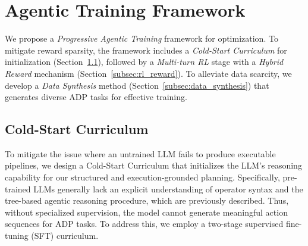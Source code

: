 \section{Agentic Training Framework}
\label{sec:agentic_training_framework}



We propose a \emph{Progressive Agentic Training} framework for optimization. To mitigate reward sparsity, the framework includes a \emph{Cold-Start Curriculum} for initialization (Section~\ref{subsec:cold_start}), followed by a \emph{Multi-turn RL} stage with a \emph{Hybrid Reward} mechanism (Section~\ref{subsec:rl_reward}). To alleviate data scarcity, we develop a \emph{Data Synthesis} method (Section~\ref{subsec:data_synthesis}) that generates diverse ADP tasks for effective training.

\subsection{Cold-Start Curriculum}
\label{subsec:cold_start}

% 

To mitigate the issue where an untrained LLM fails to produce executable pipelines, we design a Cold-Start Curriculum that initializes the LLM's reasoning capability for our structured and execution-grounded planning. 
Specifically, pre-trained LLMs generally lack an explicit understanding of operator syntax and the tree-based agentic reasoning procedure, which are previously described. Thus, without specialized supervision, the model cannot generate meaningful action sequences for ADP tasks. 
To address this, we employ a two-stage supervised fine-tuning (SFT) curriculum.

